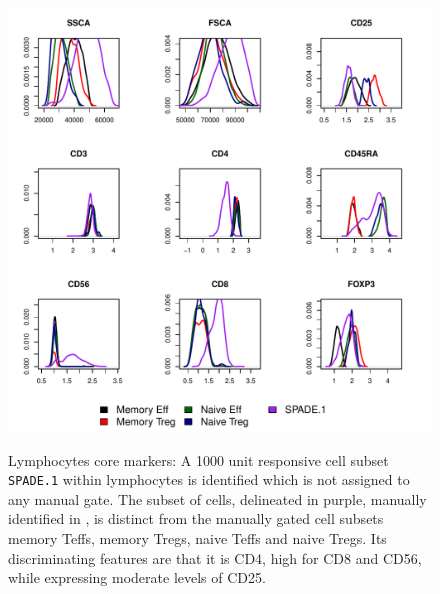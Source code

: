 %
\begin{figure}
\centering
\begin{minipage}{.65\textwidth}
\includegraphics[width=\linewidth]{figures/spade-lymphocytes-clusters}
\end{minipage}
{ Lymphocytes core markers: A 1000 unit responsive cell subset \texttt{SPADE.1} within lymphocytes is identified which is not assigned to any manual gate.  }
{ The subset of cells, delineated in purple, manually identified in , is distinct from the manually gated cell subsets memory Teffs, memory Tregs, naive Teffs and naive Tregs. Its discriminating features are that it is CD4\negative, high for CD8 and CD56, while expressing moderate levels of CD25.
} 
%
\begin{minipage}{.5\textwidth}

\end{minipage}
\end{figure}

